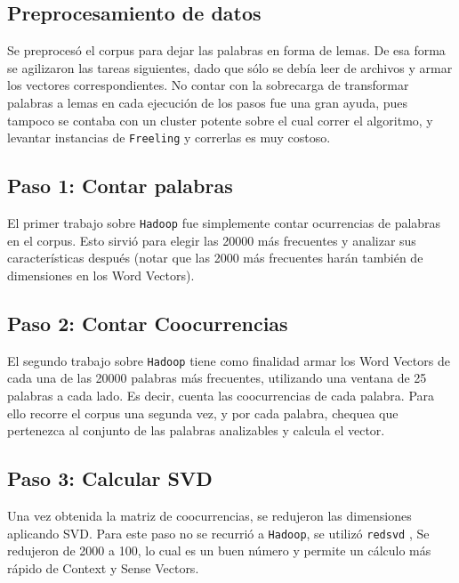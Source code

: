 \documentclass[11pt]{article}
\begin{document}
\subsection{Preprocesamiento de datos}
Se preprocesó el corpus para dejar las palabras en forma de lemas. De esa forma se agilizaron las tareas siguientes, dado que sólo se debía leer de archivos y armar los vectores correspondientes. No contar con la sobrecarga de transformar palabras a lemas en cada ejecución de los pasos fue una gran ayuda, pues tampoco se contaba con un cluster potente sobre el cual correr el algoritmo, y levantar instancias de \texttt{Freeling} y correrlas es muy costoso.
\subsection{Paso 1: Contar palabras}
El primer trabajo sobre \texttt{Hadoop} fue simplemente contar ocurrencias de palabras en el corpus. Esto sirvió para elegir las 20000 más frecuentes y analizar sus características después (notar que las 2000 más frecuentes harán también de dimensiones en los Word Vectors).
\subsection{Paso 2: Contar Coocurrencias}
El segundo trabajo sobre \texttt{Hadoop} tiene como finalidad armar los Word Vectors de cada una de las 20000 palabras más frecuentes, utilizando una ventana de 25 palabras a cada lado. Es decir, cuenta las coocurrencias de cada palabra.
Para ello recorre el corpus una segunda vez, y por cada palabra, chequea que pertenezca al conjunto de las palabras analizables y calcula el vector.


\subsection{Paso 3: Calcular SVD}
Una vez obtenida la matriz de coocurrencias, se redujeron las dimensiones aplicando SVD.
Para este paso no se recurrió a \texttt{Hadoop}, se utilizó \texttt{redsvd} \cite{Red}, 
Se redujeron de 2000 a 100, lo cual es un buen número y permite un cálculo más rápido de Context y Sense Vectors.
\end{document}
